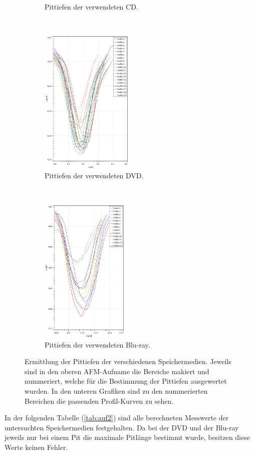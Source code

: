 \begin{figure}[H]
\begin{subfigure}[t]{0.3\textwidth}
	\caption{Pittiefen der verwendeten CD.}
	\label{abb:}
	\end{subfigure}
	~
	\begin{subfigure}[t]{0.3\textwidth}
	\includegraphics[height=7cm]{AFM_auswertung/dvd_tiefe_grafik.png}
	\caption{Pittiefen der verwendeten DVD.}
	\label{abb:}
	\end{subfigure}
	~
	\begin{subfigure}[t]{0.3\textwidth}
	\includegraphics[height=7cm]{AFM_auswertung/bluray_tiefe_grafik.png}
	\caption{Pittiefen der verwendeten Blu-ray.}
	\end{subfigure}
\caption{Ermittlung der Pittiefen der verschiedenen Speichermedien. Jeweils sind in den oberen AFM-Aufname die Bereiche makiert und nummeriert, welche f\"ur die Bestimmung der Pittiefen ausgewertet wurden. In den unteren Grafiken sind zu den nummerierten Bereichen die passenden Profil-Kurven zu sehen.}
\label{abb:pit_tiefe}
\end{figure}
In der folgenden Tabelle (\ref{tab:auf2}) sind alle berechneten Messwerte der untersuchten Speicher{\-}medien festgehalten.
Da bei der DVD und der Blu-ray jeweils nur bei einem Pit die maximale Pitl\"ange bestimmt wurde, besitzen diese Werte keinen Fehler.
